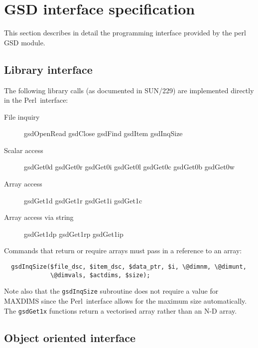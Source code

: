 \documentclass[twoside,11pt]{article}
\newcommand{\perl}{\xref{\textsf{Perl}}{sun193}{}}
\newcommand{\xref}[3]{#1}
\renewcommand{\_}{\texttt{\symbol{95}}}
\begin{document}
\section{GSD interface specification\label{appgsd}}

This section describes in detail the programming interface provided
by the perl GSD module.

\subsection{Library interface\label{LIBRARY_INTERFACE}}

The following library calls (as documented in SUN/229) are implemented
directly in the \perl\ interface:

\begin{description}
\item[File inquiry] \mbox{}

gsdOpenRead gsdClose gsdFind gsdItem gsdInqSize

\item[Scalar access] \mbox{}

gsdGet0d gsdGet0r gsdGet0i gsdGet0l gsdGet0c gsdGet0b gsdGet0w

\item[Array access] \mbox{}

gsdGet1d gsdGet1r gsdGet1i gsdGet1c

\item[Array access via string] \mbox{}

gsdGet1dp gsdGet1rp gsdGet1ip

\end{description}


Commands that return or require arrays must pass in a reference
to an array:

\begin{verbatim}
  gsdInqSize($file_dsc, $item_dsc, $data_ptr, $i, \@dimnm, \@dimunt,
             \@dimvals, $actdims, $size);
\end{verbatim}


Note also that the \texttt{gsdInqSize} subroutine does not require
a value for MAXDIMS since the \perl\ interface allows for the maximum
size automatically. The \texttt{gsdGet1x} functions return a vectorised
array rather than an N-D array.

\subsection{Object oriented interface\label{OBJECT_ORIENTED_INTERFACE}}
\end{document}
